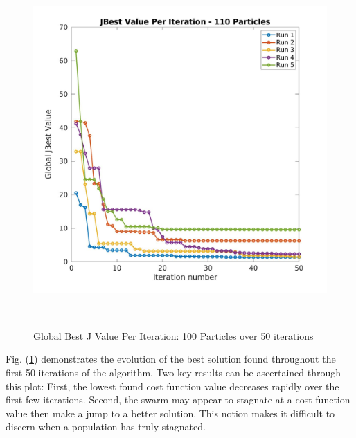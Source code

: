 \begin{figure}[H]
\includegraphics[width=\linewidth, height=13.5cm]{./jpgs/i50.jpg}
\caption{Global Best J Value Per Iteration: 100 Particles over 50 iterations}
\label{fig:gBestPer50Iter}
\end{figure}

\noindent Fig. (\ref{fig:gBestPer50Iter}) demonstrates the evolution of the best solution
found throughout the first 50 iterations of the algorithm. Two key results can be ascertained 
through this plot: First, the lowest found cost function value decreases rapidly over the first few
iterations. Second, the swarm may appear to stagnate at a cost function value then make a jump to a
better solution. This notion makes it difficult to discern when a population has truly stagnated. 


